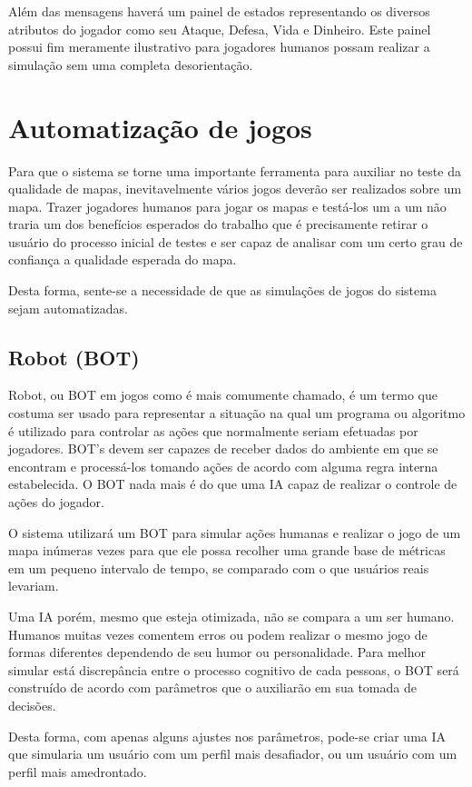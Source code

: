 Além das mensagens haverá um painel de estados representando os diversos atributos do jogador como seu Ataque, Defesa, Vida e Dinheiro. Este painel possui fim meramente ilustrativo para jogadores humanos possam realizar a simulação sem uma completa desorientação. 


\section{Automatização de jogos}

Para que o sistema se torne uma importante ferramenta para auxiliar no teste da qualidade de mapas, inevitavelmente vários jogos deverão ser realizados sobre um mapa. Trazer jogadores humanos para jogar os mapas e testá-los um a um não traria um dos benefícios esperados do trabalho que é precisamente retirar o usuário do processo inicial de testes e ser capaz de analisar com um certo grau de confiança a qualidade esperada do mapa. 

Desta forma, sente-se a necessidade de que as simulações de jogos do sistema sejam automatizadas. 

\subsection{Robot (BOT)}

Robot, ou BOT em jogos como é mais comumente chamado, é um termo que costuma ser usado para representar a situação na qual um programa ou algoritmo é utilizado para controlar as ações que normalmente seriam efetuadas por jogadores. BOT's devem ser capazes de receber dados do ambiente em que se encontram e processá-los tomando ações de acordo com alguma regra interna estabelecida. O BOT nada mais é do que uma IA capaz de realizar o controle de ações do jogador. 

O sistema utilizará um BOT para simular ações humanas e realizar o jogo de um mapa inúmeras vezes para que ele possa recolher uma grande base de métricas em um pequeno intervalo de tempo, se comparado com o que usuários reais levariam. 

Uma IA porém, mesmo que esteja otimizada, não se compara a um ser humano. Humanos muitas vezes comentem erros ou podem realizar o mesmo jogo de formas diferentes dependendo de seu humor ou personalidade.
Para melhor simular está discrepância entre o processo cognitivo de cada pessoas, o BOT será construído de acordo com parâmetros que o auxiliarão em sua tomada de decisões. 

Desta forma, com apenas alguns ajustes nos parâmetros, pode-se criar uma IA que simularia um usuário com um perfil mais desafiador, ou um usuário com um perfil mais amedrontado. 

